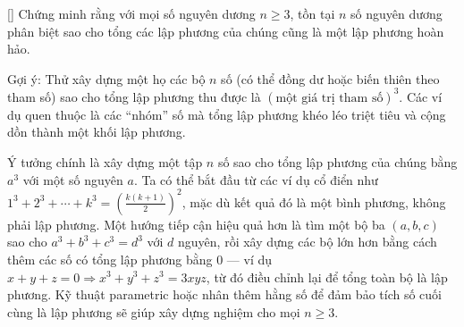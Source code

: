 \documentclass[../04-diophantine-equations.tex]{subfiles}
\begin{document}
\begin{exercise*}\label{example:BGR-2015-EGMO-TST-P6}[\textbf{}]
	Chứng minh rằng với mọi số nguyên dương \( n \geq 3 \),
	tồn tại \( n \) số nguyên dương phân biệt sao cho tổng các lập phương của chúng cũng là một lập phương hoàn hảo.
\end{exercise*}

\begin{remark*}
	Gợi ý: Thử xây dựng một họ các bộ \( n \) số (có thể đồng dư hoặc biến thiên theo tham số) sao cho tổng lập phương thu được là \( (\text{một giá trị tham số})^3 \).  
	Các ví dụ quen thuộc là các “nhóm” số mà tổng lập phương khéo léo triệt tiêu và cộng dồn thành một khối lập phương.
\end{remark*}

\begin{story*}
    Ý tưởng chính là xây dựng một tập \( n \) số sao cho tổng lập phương của chúng bằng \( a^3 \) với một số nguyên \( a \).  
    Ta có thể bắt đầu từ các ví dụ cổ điển như \( 1^3 + 2^3 + \cdots + k^3 = \left( \frac{k(k+1)}{2} \right)^2 \), mặc dù kết quả đó là một bình phương, không phải lập phương.  
    Một hướng tiếp cận hiệu quả hơn là tìm một bộ ba \( (a,b,c) \) sao cho \( a^3 + b^3 + c^3 = d^3 \) với \( d \) nguyên, rồi xây dựng các bộ lớn hơn bằng cách thêm các số có tổng lập phương bằng 0 — ví dụ \( x+y+z=0 \Rightarrow x^3 + y^3 + z^3 = 3xyz \), từ đó điều chỉnh lại để tổng toàn bộ là lập phương.  
    Kỹ thuật parametric hoặc nhân thêm hằng số để đảm bảo tích số cuối cùng là lập phương sẽ giúp xây dựng nghiệm cho mọi \( n \geq 3 \).
\end{story*}
\end{document}
